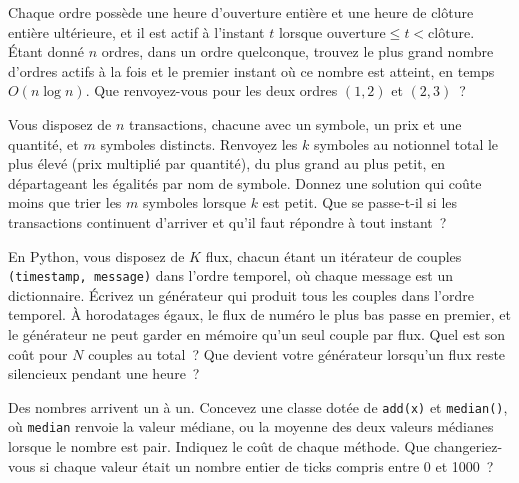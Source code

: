 \begin{question}\label{iq:iv3:algorithms:19}
Chaque ordre possède une heure d'ouverture entière et une heure de clôture entière ultérieure, et il est actif à l'instant $t$ lorsque $\text{ouverture} \le t < \text{clôture}$. Étant donné $n$ ordres, dans un ordre quelconque, trouvez le plus grand nombre d'ordres actifs à la fois et le premier instant où ce nombre est atteint, en temps $O(n \log n)$. Que renvoyez-vous pour les deux ordres $(1, 2)$ et $(2, 3)$~?
\end{question}

\begin{question}\label{iq:iv3:algorithms:20}
Vous disposez de $n$ transactions, chacune avec un symbole, un prix et une quantité, et $m$ symboles distincts. Renvoyez les $k$ symboles au notionnel total le plus élevé (prix multiplié par quantité), du plus grand au plus petit, en départageant les égalités par nom de symbole. Donnez une solution qui coûte moins que trier les $m$ symboles lorsque $k$ est petit. Que se passe-t-il si les transactions continuent d'arriver et qu'il faut répondre à tout instant~?
\end{question}

\begin{question}\label{iq:iv3:algorithms:21}
En Python, vous disposez de $K$ flux, chacun étant un itérateur de couples \texttt{(timestamp, message)} dans l'ordre temporel, où chaque message est un dictionnaire. Écrivez un générateur qui produit tous les couples dans l'ordre temporel. À horodatages égaux, le flux de numéro le plus bas passe en premier, et le générateur ne peut garder en mémoire qu'un seul couple par flux. Quel est son coût pour $N$ couples au total~? Que devient votre générateur lorsqu'un flux reste silencieux pendant une heure~?
\end{question}

\begin{question}\label{iq:iv3:algorithms:22}
Des nombres arrivent un à un. Concevez une classe dotée de \texttt{add(x)} et \texttt{median()}, où \texttt{median} renvoie la valeur médiane, ou la moyenne des deux valeurs médianes lorsque le nombre est pair. Indiquez le coût de chaque méthode. Que changeriez-vous si chaque valeur était un nombre entier de ticks compris entre 0 et 1000~?
\end{question}

